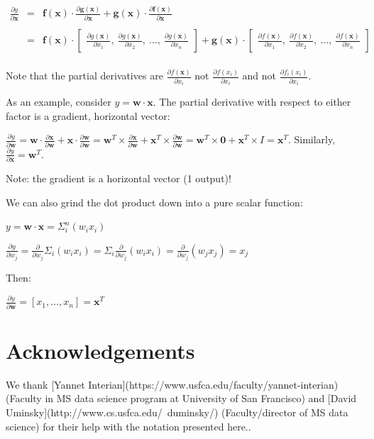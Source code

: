 \documentclass[11pt]{article}
\begin{document}
$
\begin{array}{rcl}
\frac{\partial y}{\partial \mathbf{x}} & = & \mathbf{f(x)} \cdot \frac{\partial \mathbf{g(x)}}{\partial \mathbf{x}} + \mathbf{g(x)} \cdot \frac{\partial \mathbf{f(x)}}{\partial \mathbf{x}}\\\\
 & = & \mathbf{f(x)} \cdot \begin{bmatrix} \frac{\partial g(\mathbf{x})}{\partial x_1},~ \frac{\partial g(\mathbf{x})}{\partial x_2},~ \ldots,~ \frac{\partial g(\mathbf{x})}{\partial x_n} \end{bmatrix}  + \mathbf{g(x)} \cdot \begin{bmatrix} \frac{\partial f(\mathbf{x})}{\partial x_1},~ \frac{\partial f(\mathbf{x})}{\partial x_2},~ \ldots,~ \frac{\partial f(\mathbf{x})}{\partial x_n} \end{bmatrix}\\

\end{array}
$

Note that the partial derivatives are $\frac{\partial f(\mathbf{x})}{\partial x_i}$ not $\frac{\partial f(x_i)}{\partial x_i}$ and not $\frac{\partial f_i(x_i)}{\partial x_i}$.

As an example, consider $y = \mathbf{w} \cdot \mathbf{x}$. The partial derivative with respect to either factor is a gradient, horizontal vector:

$\frac{\partial y}{\partial \mathbf{w}} = \mathbf{w} \cdot \frac{\partial \mathbf{x}}{\partial \mathbf{w}} + \mathbf{x} \cdot \frac{\partial \mathbf{w}}{\partial \mathbf{w}} = \mathbf{w}^T \times \frac{\partial \mathbf{x}}{\partial \mathbf{w}} + \mathbf{x}^T \times \frac{\partial \mathbf{w}}{\partial \mathbf{w}} = \mathbf{w}^T \times \mathbf{0} + \mathbf{x}^T \times I = \mathbf{x}^T$. Similarly, $\frac{\partial y}{\partial \mathbf{x}} = \mathbf{w}^T$.


Note: the gradient is a horizontal vector (1 output)!

We can also grind the dot product down into a pure scalar function:

$y = \mathbf{w} \cdot \mathbf{x} = \Sigma_i^n (w_i x_i)$

$\frac{\partial y}{\partial w_j} = \frac{\partial}{\partial w_j} \Sigma_i (w_i x_i) = \Sigma_i \frac{\partial}{\partial w_j} (w_i x_i) = \frac{\partial}{\partial w_j} (w_j x_j) = x_j$

Then:

$\frac{\partial y}{\partial \mathbf{w}} = [ x_1, \ldots, x_n ] = \mathbf{x}^T$

\section{Acknowledgements}

We thank [Yannet Interian](https://www.usfca.edu/faculty/yannet-interian) (Faculty in MS data science program at University of San Francisco) and [David Uminsky](http://www.cs.usfca.edu/~duminsky/) (Faculty/director of MS data science) for their help with the notation presented here..
\end{document}
